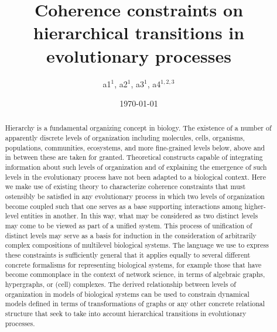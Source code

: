 \documentclass[aps,twocolumn]{revtex4-1}
\begin{document}
 

\title{\bf Coherence constraints on hierarchical transitions in evolutionary processes}

\author{a1$^{1}$, a2$^{1}$, a3$^{1}$, a4$^{1,2,3}$}


\date{\today}
\begin{abstract}
Hierarchy is a fundamental organizing concept in biology. The existence of a number of apparently discrete levels of organization including molecules, cells, organisms, populations, communities, ecosystems, and more fine-grained levels below, above and in between these are taken for granted. Theoretical constructs capable of integrating information about such levels of organization and of explaining the emergence of such levels in the evolutionary process have not been adapted to a biological context. Here we make use of existing theory to characterize coherence constraints that must ostensibly be satisfied in any evolutionary process in which two levels of organization become coupled such that one serves as a base supporting interactions among higher-level entities in another. In this way, what may be considered as two distinct levels may come to be viewed as part of a unified system. This process of unification of distinct levels may serve as a basis for induction in the consideration of arbitrarily complex compositions of multilevel biological systems. The language we use to express these constraints is sufficiently general that it applies equally to several different concrete formalisms for representing biological systems, for example those that have become commonplace in the context of network science, in terms of algebraic graphs, hypergraphs, or (cell) complexes. The derived relationship between levels of organization in models of biological systems can be used to constrain dynamical models defined in terms of transformations of graphs or any other concrete relational structure that seek to take into account hierarchical transitions in evolutionary processes.
\end{abstract}

\maketitle
\end{document}
